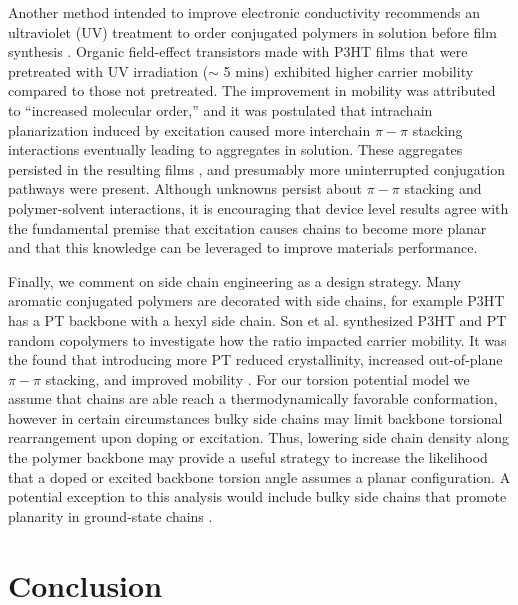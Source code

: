 Another method intended to improve electronic conductivity recommends an ultraviolet (UV) treatment to order conjugated polymers in solution before film synthesis \cite{Chang2014}. Organic field-effect transistors made with P3HT films that were pretreated with UV irradiation ($\sim$ 5 mins) exhibited higher carrier mobility compared to those not pretreated. The improvement in mobility was attributed to ``increased molecular order,'' and it was postulated that intrachain planarization induced by excitation caused more interchain $\pi-\pi$ stacking interactions eventually leading to aggregates in solution. These aggregates persisted in the resulting films \cite{Chang2014}, and presumably more uninterrupted conjugation pathways were present. Although unknowns persist about $\pi-\pi$ stacking and polymer-solvent interactions, it is encouraging that device level results agree with the fundamental premise that excitation causes chains to become more planar and that this knowledge can be leveraged to improve materials performance.

Finally, we comment on side chain engineering as a design strategy. Many aromatic conjugated polymers are decorated with side chains, for example P3HT has a PT backbone with a hexyl side chain. Son et al. synthesized P3HT and PT random copolymers to investigate how the ratio impacted carrier mobility. It was the found that introducing more PT reduced crystallinity, increased out-of-plane $\pi-\pi$ stacking, and improved mobility \cite{Son2016}. For our torsion potential model we assume that chains are able reach a thermodynamically favorable conformation, however in certain circumstances bulky side chains may limit backbone torsional rearrangement upon doping or excitation. Thus, lowering side chain density along the polymer backbone may provide a useful strategy to increase the likelihood that a doped or excited backbone torsion angle assumes a planar configuration. A potential exception to this analysis would include bulky side chains that promote planarity in ground-state chains \cite{Raithel2018}.

\section{Conclusion}

